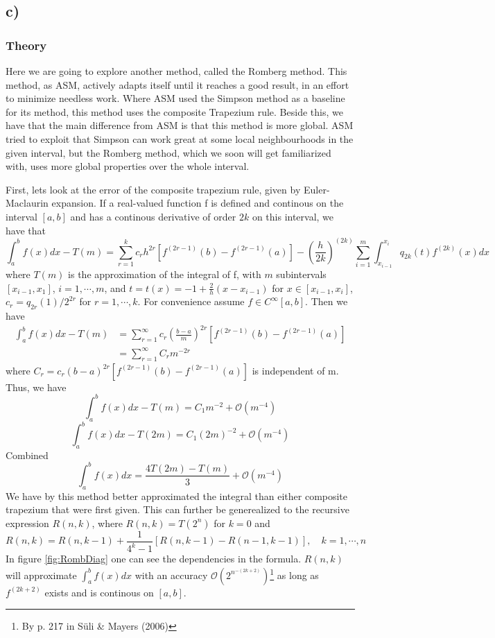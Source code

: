 \documentclass[12pt, a4paper,usenames,dvipsnames]{article}
\begin{document}
\subsection*{c)}
\subsubsection*{Theory}
 Here we are going to explore another method, called the Romberg method. This method, as ASM, actively adapts itself until it reaches a good result, in an effort to minimize needless work. Where ASM used the Simpson method as a baseline for its method, this method uses the composite Trapezium rule. Beside this, we have that the main difference from ASM is that this method is more global. ASM tried to exploit that Simpson can work great at some local neighbourhoods in the given interval, but the Romberg method, which we soon will get familiarized with, uses more global properties over the whole interval.

First, lets look at the error of the composite trapezium rule, given by Euler-Maclaurin expansion. If a real-valued function f is defined and continous on the interval \([a,b]\) and has a continous derivative of order \(2k\) on this interval, we have that 
\[\int_a^bf(x)dx-T(m)=\sum_{r=1}^kc_rh^{2r}[f^{(2r-1)}(b)-f^{(2r-1)}(a)]-\left(\frac{h}{2k}\right)^{(2k)}\sum_{i=1}^m\int_{x_{i-1}}^{x_i}q_{2k}(t)f^{(2k)}(x)dx\]
where \(T(m)\) is the approximation of the integral of f, with \(m\) subintervals \([x_{i-1},x_1]\), \(i=1,\cdots,m\), and \(t=t(x)=-1+\frac{2}{h}(x-x_{i-1})\) for \(x\in[x_{i-1},x_i]\), \(c_r=q_{2r}(1)/2^{2r}\) for \(r=1,\cdots,k\). For convenience assume \(f\in C^{\infty}[a,b]\). Then we have 
\begin{equation*}
\begin{split}
    \int_a^bf(x)dx-T(m)&=\sum_{r=1}^{\infty}c_r\left(\frac{b-a}{m}\right)^{2r}[f^{(2r-1)}(b)-f^{(2r-1)}(a)]\\
    &=\sum_{r=1}^{\infty}C_rm^{-2r}
\end{split}
\end{equation*}
where \(C_r=c_r(b-a)^{2r}[f^{(2r-1)}(b)-f^{(2r-1)}(a)]\) is independent of m. Thus, we have
\[\int_a^bf(x)dx-T(m)=C_1m^{-2}+\mathcal{O}(m^{-4})\]
\[\int_a^bf(x)dx-T(2m)=C_1(2m)^{-2}+\mathcal{O}(m^{-4})\]
Combined 
\[\int_a^bf(x)dx=\frac{4T(2m)-T(m)}{3}+\mathcal{O}(m^{-4})\]
We have by this method better approximated the integral than either composite trapezium that were first given. This can further be generealized to the recursive expression \(R(n,k)\), where \(R(n,k)=T(2^n)\) for \(k=0\) and
\[R(n,k)=R(n,k-1)+\frac{1}{4^k-1}[R(n,k-1)-R(n-1,k-1)],\quad k=1,\cdots,n\]
In figure \ref{fig:RombDiag} one can see the dependencies in the formula. \(R(n,k)\) will approximate \(\int_a^bf(x)dx\) with an accuracy \(\mathcal{O}(2^{n^{-(2k+2)}})\)\footnote{By p. 217 in Süli \& Mayers (2006)} as long as \(f^{(2k+2)}\) exists and is continous on \([a,b]\). 
\end{document}
